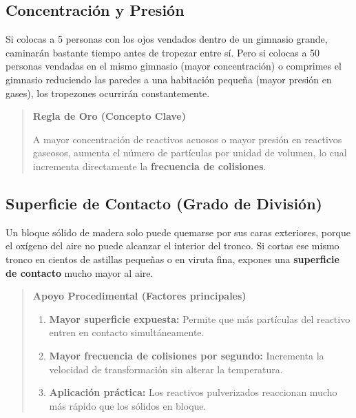 \documentclass[
  spanish,
  letterpaper,
  12pt,
  oneside,
  open=any,
  DIV=15]{scrbook}
\providecommand{\tightlist}{%
  \setlength{\itemsep}{0pt}\setlength{\parskip}{0pt}}
\begin{document}
\begin{tcolorbox}
\subsection{Concentración y
Presión}\label{concentraciuxf3n-y-presiuxf3n}

Si colocas a 5 personas con los ojos vendados dentro de un gimnasio
grande, caminarán bastante tiempo antes de tropezar entre sí. Pero si
colocas a 50 personas vendadas en el mismo gimnasio (mayor
concentración) o comprimes el gimnasio reduciendo las paredes a una
habitación pequeña (mayor presión en gases), los tropezones ocurrirán
constantemente.

\begin{quote}
\textbf{Regla de Oro (Concepto Clave)}

A mayor concentración de reactivos acuosos o mayor presión en reactivos
gaseosos, aumenta el número de partículas por unidad de volumen, lo cual
incrementa directamente la \textbf{frecuencia de colisiones}.
\end{quote}

\subsection{Superficie de Contacto (Grado de
División)}\label{superficie-de-contacto-grado-de-divisiuxf3n}

Un bloque sólido de madera solo puede quemarse por sus caras exteriores,
porque el oxígeno del aire no puede alcanzar el interior del tronco. Si
cortas ese mismo tronco en cientos de astillas pequeñas o en viruta
fina, expones una \textbf{superficie de contacto} mucho mayor al aire.

\begin{quote}
\textbf{Apoyo Procedimental (Factores principales)}

\begin{enumerate}
\def\labelenumi{\arabic{enumi}.}
\tightlist
\item
  \textbf{Mayor superficie expuesta:} Permite que más partículas del
  reactivo entren en contacto simultáneamente.
\item
  \textbf{Mayor frecuencia de colisiones por segundo:} Incrementa la
  velocidad de transformación sin alterar la temperatura.
\item
  \textbf{Aplicación práctica:} Los reactivos pulverizados reaccionan
  mucho más rápido que los sólidos en bloque.
\end{enumerate}
\end{quote}


\end{tcolorbox}
\end{document}
